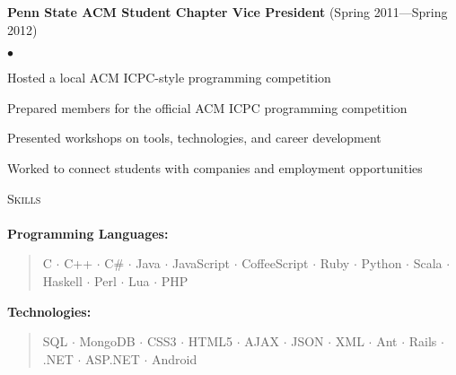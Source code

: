 \documentclass{article}
\newcommand{\skill}[2]{\textbf{#1:}  \begin{verse}#2\end{verse} }
\newcommand{\lineunder}{\vspace*{-8pt} \\ \hspace*{-18pt} \hrulefill \\}
\newcommand{\header}[1]{{\hspace*{-15pt}\vspace*{6pt} \textsc{#1}} \vspace*{-6pt} \lineunder}
\newcommand{\activity}[2]{{ \textbf{#1} (#2) \hfill \\ }}
\newenvironment{achievements}{\begin{list}{$\bullet$}{\topsep 0pt \itemsep -2pt}}{\vspace*{4pt}\end{list}}
\begin{document}
\activity{Penn State ACM Student Chapter Vice President}{Spring 2011---Spring 2012}
    \begin{achievements}
    \item Hosted a local ACM ICPC-style programming competition
    \item Prepared members for the official ACM ICPC programming competition
    \item Presented workshops on tools, technologies, and career development
    \item Worked to connect students with companies and employment opportunities
    \end{achievements}


\header{Skills}
    \skill{Programming Languages}{C $\cdot$ C++ $\cdot$ C\# $\cdot$ Java $\cdot$ JavaScript $\cdot$ CoffeeScript  
        $\cdot$ Ruby $\cdot$ Python $\cdot$ Scala $\cdot$ Haskell $\cdot$ Perl $\cdot$ Lua $\cdot$ PHP}
    \skill{Technologies}{SQL $\cdot$ MongoDB $\cdot$ CSS3 $\cdot$ HTML5 $\cdot$ AJAX $\cdot$ JSON
        $\cdot$ XML $\cdot$ Ant $\cdot$ Rails $\cdot$ .NET $\cdot$ ASP.NET $\cdot$ Android}
\end{document}
